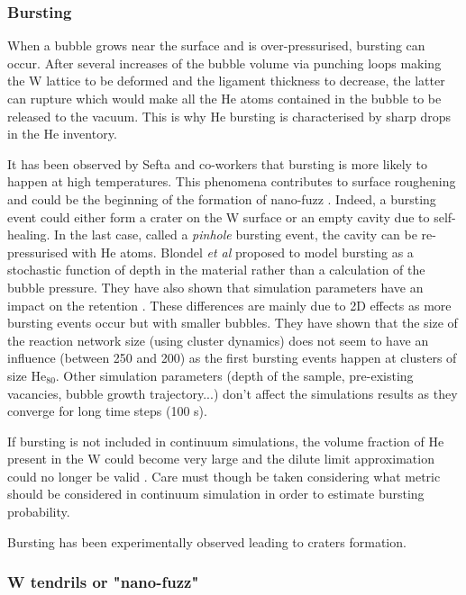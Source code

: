 \subsubsection{Bursting}

When a bubble grows near the surface and is over-pressurised, bursting can occur.
After several increases of the bubble volume via punching loops making the W lattice to be deformed and the ligament thickness to decrease, the latter can rupture which would make all the He atoms contained in the bubble to be released to the vacuum.
This is why He bursting is characterised by sharp drops in the He inventory.

It has been observed by Sefta and co-workers that bursting is more likely to happen at high temperatures.
This phenomena contributes to surface roughening and could be the beginning of the formation of nano-fuzz \cite{sefta_helium_2013}.
Indeed, a bursting event could either form a crater on the W surface or an empty cavity due to self-healing.
In the last case, called a \textit{pinhole} bursting event, the cavity can be re-pressurised with He atoms.
Blondel \textit{et al} proposed to model bursting as a stochastic function of depth in the material rather than a calculation of the bubble pressure.
They have also shown that simulation parameters have an impact on the retention \cite{blondel_continuum-scale_2018}.
These differences are mainly due to 2D effects as more bursting events occur but with smaller bubbles.
They have shown that the size of the reaction network size (using cluster dynamics) does not seem to have an influence (between 250 and 200) as the first bursting events happen at clusters of size $\text{He}_{80}$.
Other simulation parameters (depth of the sample, pre-existing vacancies, bubble growth trajectory...) don't affect the simulations results as they converge for long time steps (100 s).

If bursting is not included in continuum simulations, the volume fraction of He present in the W could become very large and the dilute limit approximation could no longer be valid \cite{sefta_surface_2013}.
Care must though be taken considering what metric should be considered in continuum simulation in order to estimate bursting probability.


Bursting has been experimentally observed \cite{hamid_molecular_2019, woller_dynamic_2015} leading to craters formation.


\subsubsection{W tendrils or "nano-fuzz"}

